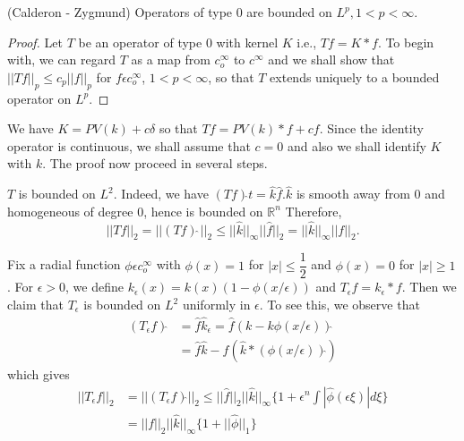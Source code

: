 \setcounter{thm}{15}
\begin{thm}\label{chap5:thm5.16} %
  (Calderon - Zygmund) Operators of type 0 are
    bounded on $L^p, 1 < p < \infty$. 
\end{thm}

\begin{proof} %
  Let $T$ be an operator of type 0 with kernel $K$ i.e., $Tf = K *
  f$. To begin with, we can regard $T$ as a map from $c^{\infty}_o$ to
  $c^{\infty}$ and we shall show that $|| Tf ||_p \le c_p || f||_p$ for
  $f \epsilon c^{\infty}_o$, $1 < p < \infty$, so that $T$ extends
  uniquely to a bounded operator on $L^p$.  
\end{proof}

We have $K = PV(k) + c \delta$ so that $Tf = PV (k) * f + cf$. Since
the identity operator is continuous, we shall assume that $c = 0$ and
also we shall identify $K$ with $k$. The proof now proceed in several
steps. 

\begin{step} \label{chap5:step1}%
  $T$ is bounded on $L^2$. Indeed, we have $(Tf) \hat{} t = \hat{k}
  \hat{f}. \hat{k}$ is smooth away from $0$ and homogeneous of degree
  $0$, hence is bounded on $\mathbb{R}^n$ Therefore, 
  $$
  || Tf ||_2 = || (Tf) \hat{~} ||_2 \le || \hat{k} ||_{\infty} || \hat{f}
  ||_2 = || \hat{k} ||_{\infty} || f ||_2. 
  $$
\end{step}

\begin{step} \label{chap5:step2}%
  Fix a radial function $\phi \epsilon c^{\infty}_o$ with $\phi (x) =
  1$ for $|x| \le \dfrac{1}{2}$ and $\phi (x) = 0$ for $|x| \ge 1$. For
  $\epsilon > 0$, we define $k_{\epsilon} (x) = k(x) (1-\phi
  (x/\epsilon))$ and $T_{\epsilon} f = k_{\epsilon} * f$. Then
  we claim that $T_{\epsilon}$ is bounded on $L^2$ uniformly in
  $\epsilon$. To see this, we observe that 
  \begin{align*}
    (T_{\epsilon} f)\hat{} & = \hat{f} \hat{k}_{\epsilon} =
    \hat{f}(k - k \phi (x/\epsilon))\hat{}\\ 
    & = \hat{f} \hat{k} - \hat{f} (\hat{k } * (\phi
    (x/\epsilon))\hat{}) 
  \end{align*}
  which gives
  \begin{align*}
    || T_{\epsilon} f ||_2 & = || (T_{\epsilon} f)\hat{} ||_2 \le ||
    \hat{f} ||_2 || \hat{k} ||_{\infty} \{ 1 +  \epsilon^n \int |
    \hat{\phi} (\epsilon \xi) | d \xi  \}\\ 
    & = || f ||_2 || \hat{k} ||_{\infty} \{ 1+ || \hat{\phi} ||_1  \}
  \end{align*}
\end{step}

